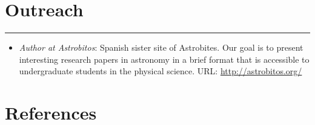 \documentclass[letterpaper,10pt]{article}
\begin{document}
\section*{Outreach}
\hrule
\vspace{.3 cm}
\begin{itemize}[label=$\blacktriangleright$]
\item \emph{Author at Astrobitos}:  Spanish sister site of Astrobites. Our goal is to present interesting research papers in astronomy in a brief format that is accessible to undergraduate students in the physical science. URL: \url{http://astrobitos.org/}
\end{itemize}





%
%



\pagebreak
\section*{References }  
\end{document}
